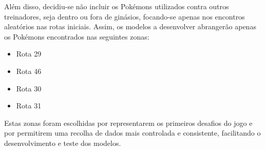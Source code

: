 Além disso, decidiu-se não incluir os Pokémons utilizados contra outros treinadores, seja dentro ou fora de ginásios, focando-se apenas nos encontros aleatórios nas rotas iniciais. Assim, os modelos a desenvolver abrangerão apenas os Pokémons encontrados nas seguintes zonas:

\begin{itemize}
    \item Rota 29
    \item Rota 46
    \item Rota 30
    \item Rota 31
\end{itemize}

Estas zonas foram escolhidas por representarem os primeiros desafios do jogo e por permitirem uma recolha de dados mais controlada e consistente, facilitando o desenvolvimento e teste dos modelos.